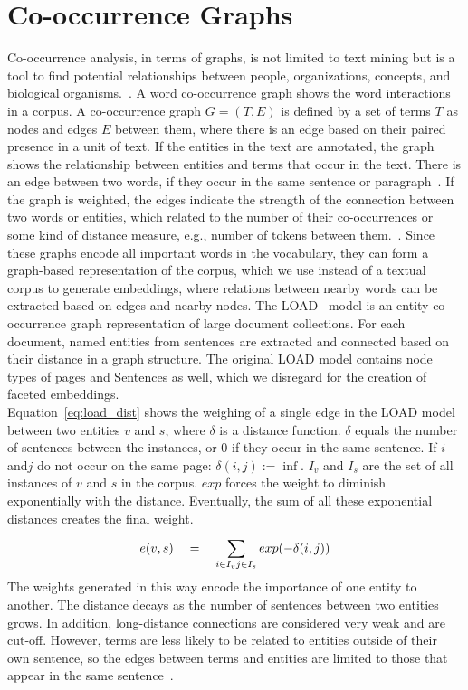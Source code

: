 \section{Co-occurrence Graphs}
\label{sec:graph}
Co-occurrence analysis, in terms of graphs, is not limited to text mining but is a tool to find potential relationships between people, organizations, concepts, and biological organisms.~. A word co-occurrence graph shows the word interactions in a corpus. A co-occurrence graph $G=(T,E)$ is defined by a set of terms $T$ as nodes and edges $E$ between them, where there is an edge based on their paired presence in a unit of text. If the entities in the text are annotated, the graph shows the relationship between entities and terms that occur in the text. There is an edge between two words, if they occur in the same sentence or paragraph~. If the graph is weighted, the edges indicate the strength of
the connection between two words or entities, which related to the number of their co-occurrences or some kind of distance measure, e.g., number of tokens between them.~. Since these graphs encode all important words in the vocabulary, they can form a graph-based representation of the corpus, which we use instead of a textual corpus to generate embeddings, where relations between nearby words can be extracted based on edges and nearby nodes.
The LOAD~ model is an entity co-occurrence graph representation of large document collections. For each document, named entities from sentences are extracted and connected based on their distance in a graph structure. The original LOAD model contains node types of pages and Sentences as well, which we disregard for the creation of faceted embeddings. \\
Equation~\ref{eq:load_dist} shows the weighing of a single edge in the LOAD model between two entities $v$ and $s$, where $\delta $ is a distance function. $\delta $ equals the number of sentences between the
instances, or $0$ if they occur in the same sentence. If $i$ and$ j$
do not occur on the same page: $ \delta(i, j) := \inf$. $ I_{ v }$ and $I_{ s } $ are the set of all instances of $v$ and $s$ in the corpus. $exp$ forces the weight to diminish exponentially with the distance. Eventually, the sum of all these exponential distances creates the final weight. 
\begin{equation}
e (v,s)\quad =\quad \sum _{ i\in I_{ v } \\ j\in I_{ s } }^{  }{ exp } (-\delta (i,j))
\label{eq:load_dist}
\end{equation}
The weights generated in this way encode the importance of one entity to another. The distance decays as the number of sentences between two entities grows.  In addition, long-distance connections are considered very weak and are cut-off.  However, terms are less likely to be related to entities outside of their own sentence, so the edges between terms and entities are limited to those that appear in the same sentence~. 


